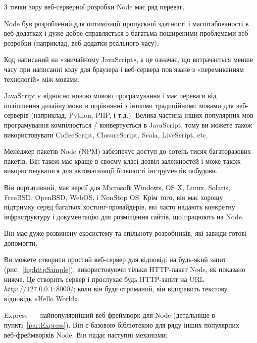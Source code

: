 З точки зору веб-серверної розробки Node має ряд переваг.

Node був розроблений для оптимізації пропускної здатності і масштабованості в веб-додатках і дуже добре справляється з багатьма поширеними проблемами веб-розробки (наприклад, веб-додатки реального часу).

Код написаний на «звичайному JavaScript», а це означає, що витрачається менше часу при написанні коду для браузера і веб-сервера пов'язане з «перемиканням технологій» між мовами.

JavaScript є відносно новою мовою програмування і має переваги від поліпшення дизайну мови в порівнянні з іншими традиційними мовами для веб-серверів (наприклад, Python, PHP, і т.д.). Велика частина інших популярних мов програмування компілюється / конвертується в JavaScript, тому ви можете також використовувати CoffeeScript, ClosureScript, Scala, LiveScript, etc.

Менеджер пакетів Node (NPM) забезпечує доступ до сотень тисяч багаторазових пакетів. Він також має краще в своєму класі дозвіл залежностей і може також використовуватися для автоматизації більшості інструментів побудови.

Він портативний, має версії для Microsoft Windows, OS X, Linux, Solaris, FreeBSD, OpenBSD, WebOS, і NonStop OS. Крім того, він має хорошу підтримку серед багатьох хостинг-провайдерів, які часто надають конкретну інфраструктуру і документацію для розміщення сайтів, що працюють на Node.

Він має дуже розвинену екосистему та спільноту розробників, які завжди готові допомогти.

Ви можете створити простий веб-сервер для відповіді на будь-який запит (рис.~\ref{fig:httpSample}), використовуючи тільки HTTP-пакет Node, як показано нижче. Це створить сервер і прослухає будь HTTP-запит на URL $http://127.0.0.1:8000/$; коли він буде отриманий, він відправить текстову відповідь «Hello World».


Express~--- найпопулярніший веб-фреймворк для Node (детальніше в пункті~\ref{par:Express}). Він є базовою бібліотекою для ряду інших популярних веб-фреймворків Node. Він надає наступні механізми:

